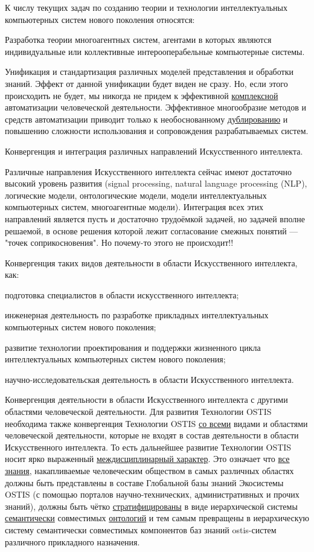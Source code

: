 К числу текущих задач по созданию теории и технологии интеллектуальных компьютерных систем нового поколения относятся:
\begin{textitemize}
	\item Разработка теории многоагентных систем, агентами в которых являются индивидуальные или коллективные интерооперабельные компьютерные системы.
	\item Унификация и стандартизация различных моделей представления и обработки знаний. Эффект от данной унификации будет виден не сразу. Но, если этого происходить не будет, мы никогда не придем к эффективной \uline{комплексной} автоматизации человеческой деятельности. Эффективное многообразие методов и средств автоматизации приводит только к необоснованному \uline{дублированию} и повышению сложности использования и сопровождения разрабатываемых систем.
	\item Конвергенция и интеграция различных направлений Искусственного интеллекта.
	\item Различные направления Искусственного интеллекта сейчас имеют достаточно высокий уровень развития (signal processing, natural language processing (NLP), логические модели, онтологические модели, модели интеллектуальных компьютерных систем, многоагентные модели). Интеграция всех этих направлений является пусть и достаточно трудоёмкой задачей, но задачей вполне решаемой, в основе решения которой лежит согласование смежных понятий --- "точек соприкосновения"{}. Но почему-то этого не происходит!!
	\item Конвергенция таких видов деятельности в области Искусственного интеллекта, как:
	\begin{textitemize}
		\item подготовка специалистов в области искусственного интеллекта;
		\item инженерная деятельность по разработке прикладных интеллектуальных компьютерных систем нового поколения;
		\item развитие технологии проектирования и поддержки жизненного цикла интеллектуальных компьютерных систем нового поколения;
		\item научно-исследовательская деятельность в области Искусственного интеллекта.
	\end{textitemize}
	\item Конвергенция деятельности в области Искусственного интеллекта с другими областями человеческой деятельности. Для развития Технологии OSTIS необходима также конвергенция Технологии OSTIS \uline{со всеми} видами и областями человеческой деятельности, которые не входят в состав деятельности в области Искусственного интеллекта. То есть дальнейшее развитие Технологии OSTIS носит ярко выраженный \uline{междисциплинарный характер}. Это означает что \uline{все знания}, накапливаемые человеческим обществом в самых различных областях должны быть представлены в составе Глобальной базы знаний Экосистемы OSTIS (с помощью порталов научно-технических, административных и прочих знаний), должны быть чётко \uline{стратифицированы} в виде иерархической системы \uline{семантически} совместимых \uline{онтологий} и тем самым превращены в иерархическую систему семантически совместимых компонентов баз знаний ostis-систем различного прикладного назначения.

\end{textitemize}
